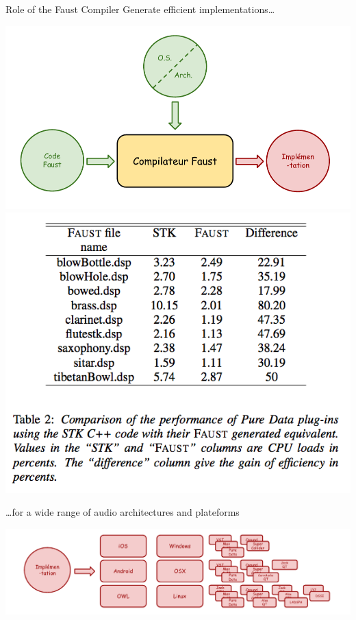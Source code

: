 
\begin{frame}{Role of the Faust Compiler}{}
Generate efficient implementations\ldots

\begin{center}
\includegraphics[width=0.60\columnwidth]{images/role-du-compilateur-faust}
\includegraphics[width=0.40\columnwidth]{images/faust-stk-performance}
\end{center}

\ldots for a wide range of audio architectures and plateforms

\begin{center}
\includegraphics[width=0.80\columnwidth]{images/multiples-architectures}
\end{center}
\end{frame}
